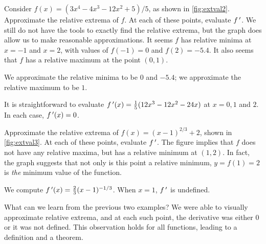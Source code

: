\begin{example}\label{ex_extval2}%
Consider $f(x) = (3x^4-4x^3-12x^2+5)/5$, as shown in \autoref{fig:extval2}. Approximate the relative extrema of $f$. At each of these points, evaluate $f\,'$.
\solution
We still do not have the tools to exactly find the relative extrema, but the graph does allow us to make reasonable approximations. It seems $f$ has relative minima at $x=-1$ and $x=2$, with values of $f(-1)=0$ and $f(2) = -5.4$. It also seems that $f$ has a relative maximum at the point $(0,1)$. 

We approximate the relative minima to be $0$ and $-5.4$; we approximate the relative maximum to be $1$.

It is straightforward to evaluate $f\,'(x) =\frac15(12x^3-12x^2-24x)$ at $x=0, 1$ and $2$. In each case, $f\,'(x) = 0$.
\end{example}


\begin{example}\label{ex_extval3}%
Approximate the relative extrema of $f(x) = (x-1)^{2/3}+2$, shown in \autoref{fig:extval3}. At each of these points, evaluate $f\,'$.
\solution
The figure implies that $f$ does not have any relative maxima, but has a relative minimum at $(1,2)$. In fact, the graph suggests that not only is this point a relative minimum, $y=f(1)=2$ is \emph{the} minimum value of the function.

We compute $f\,'(x) = \frac23(x-1)^{-1/3}$. When $x=1$, $f\,'$ is undefined.
\end{example}

What can we learn from the previous two examples? We were able to visually approximate relative extrema, and at each such point, the derivative was either 0 or it was not defined. This observation holds for all functions, leading to a definition and a theorem.

